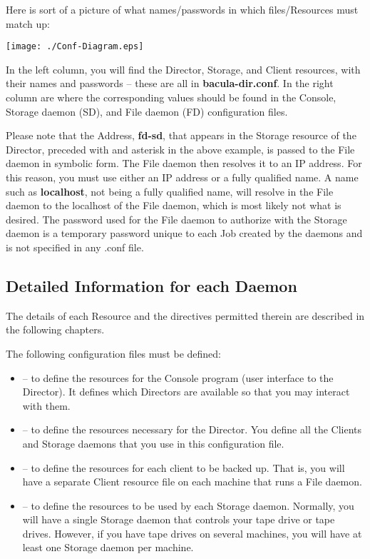 Here is sort of a picture of what names/passwords in which files/Resources
must match up: 

\texttt{[image: ./Conf-Diagram.eps]} 

In the left column, you will find the Director, Storage, and Client resources,
with their names and passwords -- these are all in {\bf bacula-dir.conf}. In
the right column are where the corresponding values should be found in the
Console, Storage daemon (SD), and File daemon (FD) configuration files. 

Please note that the Address, {\bf fd-sd}, that appears in the Storage
resource of the Director, preceded with and asterisk in the above example, is
passed to the File daemon in symbolic form. The File daemon then resolves it
to an IP address. For this reason, you must use either an IP address or a
fully qualified name. A name such as {\bf localhost}, not being a fully
qualified name, will resolve in the File daemon to the localhost of the File
daemon, which is most likely not what is desired. The password used for the
File daemon to authorize with the Storage daemon is a temporary password
unique to each Job created by the daemons and is not specified in any .conf
file. 

\subsection*{Detailed Information for each Daemon}

The details of each Resource and the directives permitted therein are
described in the following chapters. 

The following configuration files must be defined: 

\begin{itemize}
\item 
    -- to define the resources for 
   the Console program (user interface to the Director).  It defines which
Directors are  available so that you may interact with them. 
\item 
    -- to define the resources 
   necessary for the Director. You define all the Clients  and Storage daemons
that you use in this configuration file.  
\item 
    -- to define the resources for 
   each client to be backed up. That is, you will have a separate  Client
resource file on each machine that runs a File daemon. 
\item 
    -- to define the resources to 
   be used by each Storage daemon. Normally, you will have  a single Storage
daemon that controls your tape drive or tape  drives. However, if you have
tape drives on several machines,  you will have at least one Storage daemon
per machine.  
\end{itemize}
